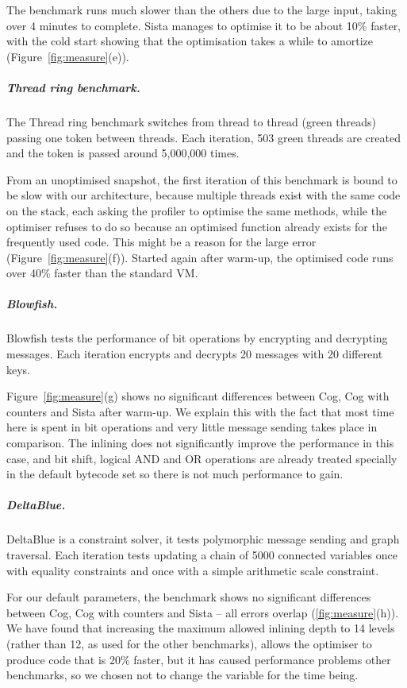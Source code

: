 \documentclass[a4paper,12pt,twoside]{../includes/ThesisStyle}
\begin{document}
The benchmark runs much slower than the others due to the large input, taking over 4 minutes to complete. Sista manages to optimise it to be about 10\% faster, with the cold start showing that the optimisation takes a while to amortize (Figure~\ref{fig:measure}(e)).

\subparagraph{Thread ring benchmark.}

The Thread ring benchmark switches from thread to thread (green threads) passing one token between threads. Each iteration, 503 green threads are created and the token is passed around 5,000,000 times.

From an unoptimised snapshot, the first iteration of this benchmark is bound to be slow with our architecture, because multiple threads exist with the same code on the stack, each asking the profiler to optimise the same methods, while the optimiser refuses to do so because an optimised function already exists for the frequently used code. This might be a reason for the large error (Figure~\ref{fig:measure}(f)). Started again after warm-up, the optimised code runs over 40\% faster than the standard VM.

\subparagraph{Blowfish.}

Blowfish tests the performance of bit operations by encrypting and decrypting messages. Each iteration encrypts and decrypts 20 messages with 20 different keys.

Figure~\ref{fig:measure}(g) shows no significant differences between Cog, Cog with counters and Sista after warm-up. We explain this with the fact that most time here is spent in bit operations and very little message sending takes place in comparison. The inlining does not significantly improve the performance in this case, and bit shift, logical AND and OR operations are already treated specially in the default bytecode set so there is not much performance to gain.

\subparagraph{DeltaBlue.}

DeltaBlue is a constraint solver, it tests polymorphic message sending and graph traversal. Each iteration tests updating a chain of 5000 connected variables once with equality constraints and once with a simple arithmetic scale constraint.

For our default parameters, the benchmark shows no significant differences between Cog, Cog with counters and Sista -- all errors overlap (\ref{fig:measure}(h)). We have found that increasing the maximum allowed inlining depth to 14 levels (rather than 12, as used for the other benchmarks), allows the optimiser to produce code that is 20\% faster, but it has caused performance problems other benchmarks, so we chosen not to change the variable for the time being.
\end{document}
